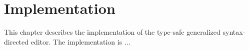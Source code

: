 \chapter{Implementation}
\label{ch:implementation}

This chapter describes the implementation of the type-safe generalized syntax-directed editor. The implementation is ...

